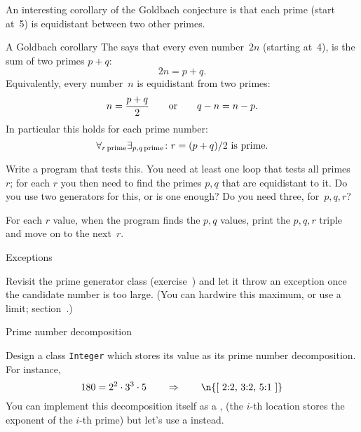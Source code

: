 An interesting corollary of the Goldbach conjecture is that
each prime (start at~5) is equidistant between two other primes.

\begin{block}{A Goldbach corollary}
  \label{sl:goldbach-pqr}
  The  says that every even number~$2n$
  (starting at~4), is the sum of two primes $p+q$: \[ 2n=p+q.\]
  Equivalently, every number~$n$ is equidistant from two primes:
  \[ n=\frac{p+q}2\qquad\hbox{or}\qquad q-n = n-p.\]
  In particular this holds for each prime number:
  \[ \forall_{r\,\mathrm{prime}}\exists_{p,q\,\mathrm{prime}}\colon
  \hbox{$r=(p+q)/2$ is prime}. \]
\end{block}

\begin{exercise}
  \label{ex:prime:goldbach-pqr}

  Write a program that tests this. You need at least one loop that
  tests all primes~$r$; for each $r$ you then need to find the primes
  $p,q$ that are equidistant to it. Do you use two generators for
  this, or is one enough? Do you need three, for~$p,q,r$?

  For each $r$ value, 
  when the program finds the $p,q$ values, print the $p,q,r$ triple and
  move on to the next~$r$.
\end{exercise}

 {Exceptions}


\begin{exercise}
  \label{ex:primegenbreak}
  Revisit the prime generator class (exercise~)
  and let it throw an exception once the candidate number is too large.
  (You can hardwire this maximum, or use a limit; section~.)

\end{exercise}

 {Prime number decomposition}
\label{sec:prime-decomp}


Design a class \lstinline{Integer} which stores its value
as its prime number decomposition. For instance,
\[ 180=2^2\cdot 3^3\cdot 5 \qquad \Rightarrow \qquad \hbox{\n{[ 2:2, 3:2, 5:1 ]}} \]
You can implement this decomposition itself as a ,
(the $i$-th location stores the exponent of the $i$-th prime)
but let's use a  instead.

